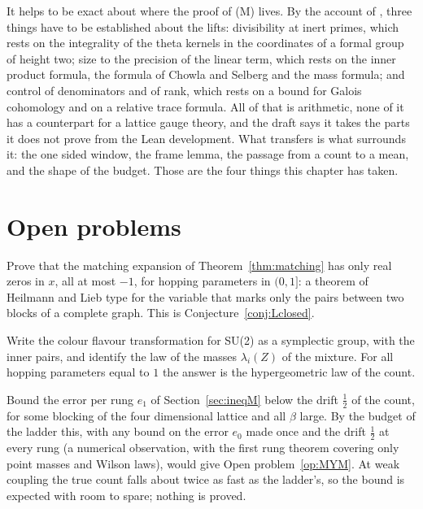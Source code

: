 It helps to be exact about where the proof of (M) lives. By the account of \cite{Rub26}, three things have to be established about the lifts: divisibility at inert primes, which rests on the integrality of the theta kernels in the coordinates of a formal group of height two; size to the precision of the linear term, which rests on the inner product formula, the formula of Chowla and Selberg and the mass formula; and control of denominators and of rank, which rests on a bound for Galois cohomology and on a relative trace formula. All of that is arithmetic, none of it has a counterpart for a lattice gauge theory, and the draft says it takes the parts it does not prove from the Lean development. What transfers is what surrounds it: the one sided window, the frame lemma, the passage from a count to a mean, and the shape of the budget. Those are the four things this chapter has taken.

\section{Open problems}

\begin{problem}\label{op:matching}
Prove that the matching expansion of Theorem~\ref{thm:matching} has only real zeros in $x$, all at most $-1$, for hopping parameters in $(0,1]$: a theorem of Heilmann and Lieb type for the variable that marks only the pairs between two blocks of a complete graph. This is Conjecture~\ref{conj:Lclosed}.
\end{problem}

\begin{problem}\label{op:symplectic}
Write the colour flavour transformation for SU(2) as a symplectic group, with the inner pairs, and identify the law of the masses $\lambda_i(Z)$ of the mixture. For all hopping parameters equal to $1$ the answer is the hypergeometric law of the count.
\end{problem}

\begin{problem}\label{op:slopes}
Bound the error per rung $e_1$ of Section~\ref{sec:ineqM} below the drift $\frac12$ of the count, for some blocking of the four dimensional lattice and all $\beta$ large. By the budget of the ladder this, with any bound on the error $e_0$ made once and the drift $\frac12$ at every rung (a numerical observation, with the first rung theorem covering only point masses and Wilson laws), would give Open problem~\ref{op:MYM}. At weak coupling the true count falls about twice as fast as the ladder's, so the bound is expected with room to spare; nothing is proved.
\end{problem}

